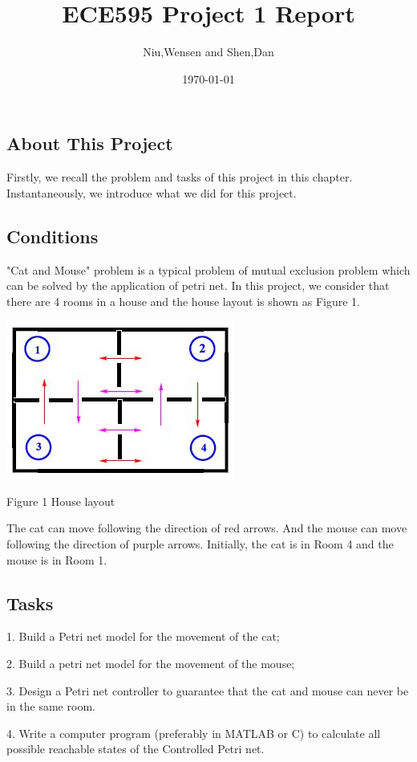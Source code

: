 \documentclass[11pt]{article}
\begin{document}
\tableofcontents

\title{ECE595 Project 1 Report}
\author{Niu,Wensen and Shen,Dan}
\date{\today}
\maketitle
\begin{flushleft}
\section{About This Project}
	Firstly, we recall the problem and tasks of this project in this chapter. Instantaneously, we introduce what we did for this project.
	\subsection{Conditions}
	"Cat and Mouse" problem is a typical problem of mutual exclusion problem which can be solved by the application of petri net. In this project, we consider that there are 4 rooms in a house and the house layout is shown as Figure 1.
	\begin{center}
	\includegraphics[]{houselayout.JPG}
	
	Figure 1 House layout
	\end{center}
	The cat can move following the direction of red arrows. And the mouse can move following the direction of purple arrows. Initially, the cat is in Room 4 and the mouse is in Room 1.
	
	\subsection{Tasks}
	1. Build a Petri net model for the movement of the cat;
	
	2. Build a petri net model for the movement of the mouse;
	
	3. Design a Petri net controller to guarantee that the cat and mouse can never be in the same room.
	
	4. Write a computer program (preferably in MATLAB or C) to calculate all possible reachable states of the Controlled Petri net.
		

\end{flushleft}
\end{document}
